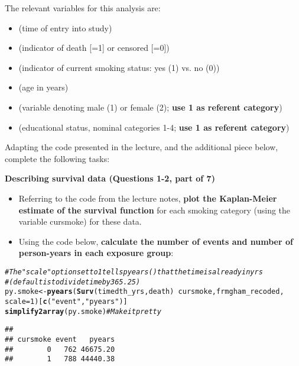 \documentclass{article}\usepackage[]{graphicx}\usepackage[]{color}
\makeatletter
\newcommand{\hlnum}[1]{\textcolor[rgb]{0.686,0.059,0.569}{#1}}%
\newcommand{\hlstr}[1]{\textcolor[rgb]{0.192,0.494,0.8}{#1}}%
\newcommand{\hlcom}[1]{\textcolor[rgb]{0.678,0.584,0.686}{\textit{#1}}}%
\newcommand{\hlopt}[1]{\textcolor[rgb]{0,0,0}{#1}}%
\newcommand{\hlstd}[1]{\textcolor[rgb]{0.345,0.345,0.345}{#1}}%
\newcommand{\hlkwb}[1]{\textcolor[rgb]{0.69,0.353,0.396}{#1}}%
\newcommand{\hlkwc}[1]{\textcolor[rgb]{0.333,0.667,0.333}{#1}}%
\newcommand{\hlkwd}[1]{\textcolor[rgb]{0.737,0.353,0.396}{\textbf{#1}}}%
\newenvironment{kframe}{%
 \def\at@end@of@kframe{}%
 \ifinner\ifhmode%
  \def\at@end@of@kframe{\end{minipage}}%
  \begin{minipage}{\columnwidth}%
 \fi\fi%
 \def\FrameCommand##1{\hskip\@totalleftmargin \hskip-\fboxsep
 \colorbox{shadecolor}{##1}\hskip-\fboxsep
     \hskip-\linewidth \hskip-\@totalleftmargin \hskip\columnwidth}%
 \MakeFramed {\advance\hsize-\width
   \@totalleftmargin\z@ \linewidth\hsize
   \@setminipage}}%
 {\par\unskip\endMakeFramed%
 \at@end@of@kframe}
\newenvironment{knitrout}{}{} %
\newif\ifdraft  %
\makeatother
\begin{document}
The relevant variables for this analysis are:
\begin{itemize}
  \item {} (time of entry into study)
  \item {} (indicator of death [=1] or censored [=0])
  \item {} (indicator of current smoking status: yes (1) vs. no (0))
  \item {} (age in years)
  \item {} (variable denoting male (1) or female (2); \textbf{use 1 as referent category})
  \item {} (educational status, nominal categories 1-4; \textbf{use 1 as referent category})
\end{itemize}

Adapting the code presented in the lecture, and the additional piece below, complete the following tasks:

\vspace{2mm}

\textbf{Describing survival data (Questions 1-2, part of 7)}

\begin{itemize}
  \item Referring to the code from the lecture notes, \textbf{plot the Kaplan-Meier estimate of the survival function} for each smoking category (using the variable cursmoke) for these data.
  \item Using the code below, \textbf{calculate the number of events and number of person-years in each exposure group}:
\end{itemize}

\fi

\ifdraft

\begin{knitrout}
\color{fgcolor}\begin{kframe}
\begin{alltt}
\hlcom{# The "scale" option set to 1 tells pyears() that the time is already in yrs}
\hlcom{# (default is to divide time by 365.25)}
\hlstd{py.smoke} \hlkwb{<-} \hlkwd{pyears}\hlstd{(}\hlkwd{Surv}\hlstd{(timedth_yrs,death)}\hlopt{~}\hlstd{cursmoke, frmgham_recoded,}
\hlkwc{scale}\hlstd{=}\hlnum{1}\hlstd{)[}\hlkwd{c}\hlstd{(}\hlstr{"event"}\hlstd{,}\hlstr{"pyears"}\hlstd{)]}
\hlkwd{simplify2array}\hlstd{(py.smoke)} \hlcom{# Make it pretty}
\end{alltt}
\begin{verbatim}
##         
## cursmoke event   pyears
##        0   762 46675.20
##        1   788 44440.38
\end{verbatim}
\end{kframe}
\end{knitrout}
\end{document}
